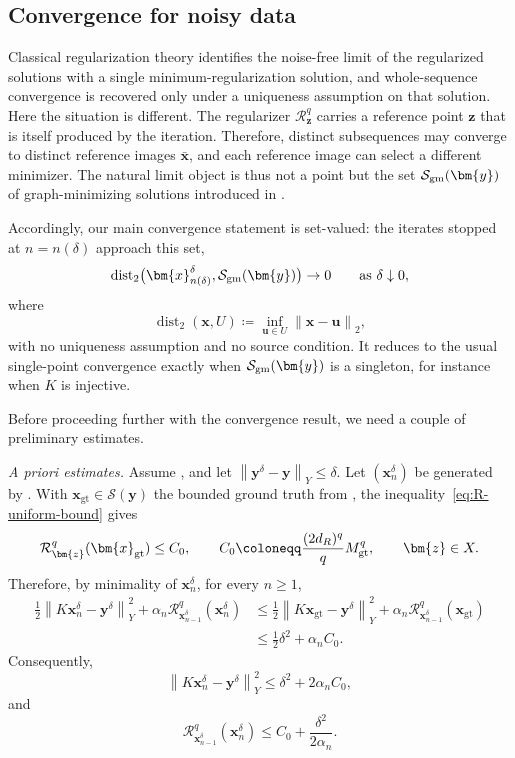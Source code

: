 \documentclass{article}
\theoremstyle{remark}
\newcommand{\gt}{\bm{x}_{\mathrm{gt}}}
\newcommand{\norm}[1]{\left\lVert #1 \right\rVert}
\newcommand{\Rreg}{\mathcal{R}}
\newcommand{\Ssol}{\mathcal{S}}
\newcommand{\bx}{{\bm{x}}}
\newcommand{\by}{{\bm{y}}}
\newcommand{\bz}{{\bm{z}}}
\newcommand{\bu}{{\bm{u}}}
\begin{document}
\subsection{Convergence for noisy data}

Classical regularization theory identifies the noise-free limit of the
regularized solutions with a single minimum-regularization solution, and
whole-sequence convergence is recovered only under a uniqueness assumption on
that solution. Here the situation is different. The regularizer
$\Rreg_\bz^q$ carries a reference point $\bz$ that is itself produced by the
iteration. Therefore, distinct
subsequences may converge to distinct reference images $\bar\bx$, and each reference image
can select a different minimizer. The natural limit object is thus not a
point but the set $\mathcal S_{\rm gm}(\by)$ of graph-minimizing solutions
introduced in .

Accordingly, our main convergence statement is set-valued: the iterates stopped at $n=n(\delta)$
approach this set,
\[
\operatorname{dist}_2\bigl(\bx_{n(\delta)}^\delta,\mathcal S_{\rm gm}(\by)\bigr)
\to0
\qquad\text{as }\delta\downarrow0,
\]
where
\[
\operatorname{dist}_2(\bx,U)
\coloneqq
\inf_{\bu\in U}\norm{\bx-\bu}_2,
\]
with no uniqueness assumption and no source condition. It reduces to the usual
single-point convergence exactly when $\mathcal S_{\rm gm}(\by)$ is a singleton,
for instance when $K$ is injective. 

Before proceeding further with the convergence result, we need a couple of preliminary estimates.

\medskip
\noindent\textit{A priori estimates.}
Assume , and let
$\norm{\by^\delta-\by}_Y\le\delta$. Let $(\bx_n^\delta)$ be generated by
. With $\gt\in\Ssol(\by)$ the bounded ground truth from
, the inequality~\cref{eq:R-uniform-bound} gives
\begin{equation*}
\Rreg_{\bz}^q(\gt)\le C_0,
\qquad
C_0\coloneqq\frac{(2d_R)^q}{q}M_{\rm gt}^q ,
\qquad \bz\in X .
\end{equation*}
Therefore, by minimality of $\bx_n^\delta$, for every $n\ge1$,
\begin{equation*}
\begin{aligned}
\frac12\norm{K\bx_n^\delta-\by^\delta}_Y^2
+\alpha_n\Rreg_{\bx_{n-1}^\delta}^q(\bx_n^\delta)
&\le
\frac12\norm{K\gt-\by^\delta}_Y^2
+\alpha_n\Rreg_{\bx_{n-1}^\delta}^q(\gt)\\
&\le \frac12\delta^2+\alpha_n C_0 .
\end{aligned}
\end{equation*}
Consequently,
\begin{equation}\label{eq:noisy-res-bound}
\norm{K\bx_n^\delta-\by^\delta}_Y^2
\le \delta^2+2\alpha_n C_0,
\end{equation}
and
\begin{equation}\label{eq:noisy-reg-bound}
\Rreg_{\bx_{n-1}^\delta}^q(\bx_n^\delta)
\le C_0+\frac{\delta^2}{2\alpha_n}.
\end{equation}
\end{document}
